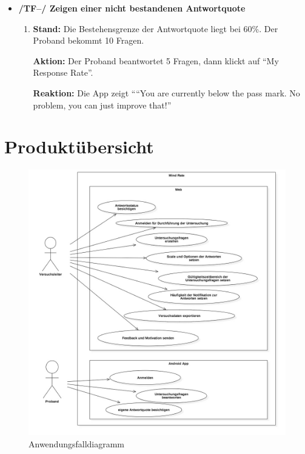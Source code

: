 \documentclass[a4paper]{scrreprt}
\begin{document}
\begin{itemize}
            \item \textbf{/TF--/ Zeigen einer nicht bestandenen Antwortquote}
            \begin{enumerate}
                \item \par \textbf{Stand: }Die Bestehensgrenze der Antwortquote liegt bei 60\%. Der Proband bekommt 10 Fragen.
                \par \textbf{Aktion: }Der Proband beantwortet 5 Fragen, dann klickt auf “My Response Rate”.
                \par \textbf{Reaktion: }Die App zeigt ““You are currently below the pass mark. No problem, you can just improve that!”
            \end{enumerate}

            \end{itemize}

    \chapter{Produktübersicht}
            \begin{figure}[htbp]
                \centering
                \includegraphics[scale = 0.4]{UseCaseDiagram1.jpg}
                \caption{Anwendungsfalldiagramm}
            \end{figure}


    \glsaddall
    \printglossaries

    \listoffigures
\end{document}
